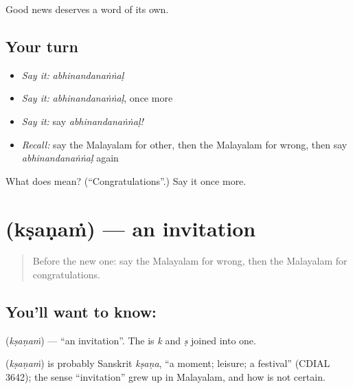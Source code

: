 \begin{grammarlens}[title={What you've built}]
Good news deserves a word of its own.
\end{grammarlens}

\subsection*{Your turn}
\begin{itemize}
\raggedright
  \item \emph{Say it:} \emph{abhinandanaṅṅaḷ}
  \item \emph{Say it:} \emph{abhinandanaṅṅaḷ}, once more
  \item \emph{Say it:} say \emph{abhinandanaṅṅaḷ!}
  \item \emph{Recall:} say the Malayalam for other, then the Malayalam for wrong, then say \emph{abhinandanaṅṅaḷ} again
\end{itemize}

\begin{tcolorbox}[breakable,colback=teal!4,colframe=teal!35!black,title={Before you move on}]
What does  mean? (\textquotedblleft{}Congratulations\textquotedblright{}.) Say it once more.
\end{tcolorbox}
\section[\texorpdfstring{\ml{ക്ഷണം} (kṣaṇaṁ)}{ക്ഷണം (kṣaṇaṁ)}]{ (kṣaṇaṁ) — an invitation}

\label{lesson:ML-C124-invitation}



\begin{quote}
Before the new one: say the Malayalam for wrong, then the Malayalam for congratulations.
\end{quote}

\subsection*{You'll want to know: }
\textbf{} (\emph{kṣaṇaṁ}) — \textquotedblleft{}an invitation\textquotedblright{}. The \textbf{} is \emph{k} and \emph{ṣ} joined into one.

\begin{cousinweb}
\textbf{} (\emph{kṣaṇaṁ}) is probably Sanskrit \emph{kṣaṇa}, \textquotedblleft{}a moment; leisure; a festival\textquotedblright{} (CDIAL 3642); the sense \textquotedblleft{}invitation\textquotedblright{} grew up in Malayalam, and how is not certain.
\end{cousinweb}

